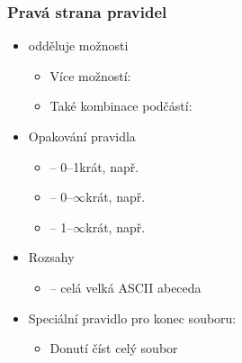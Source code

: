 \begin{frame}
  \frametitle{Pravá strana pravidel}

  \begin{itemize}
    \item \code{|} odděluje možnosti
    \begin{itemize}
      \item Více možností: 
      \item Také kombinace podčástí: 
    \end{itemize}

    \pause

    \item Opakování pravidla
    \begin{itemize}
      \item {} -- 0--1krát, např.\ 
      \item {} -- 0--$\infty$krát, např.\ 
      \item {} -- 1--$\infty$krát, např.\ 
    \end{itemize}

    \pause

    \item Rozsahy
    \begin{itemize}
      \item {} -- celá velká ASCII abeceda
    \end{itemize}

    \pause

    \item Speciální pravidlo pro konec souboru: 
    \begin{itemize}
      \item Donutí číst celý soubor
    \end{itemize}
  \end{itemize}

\end{frame}

